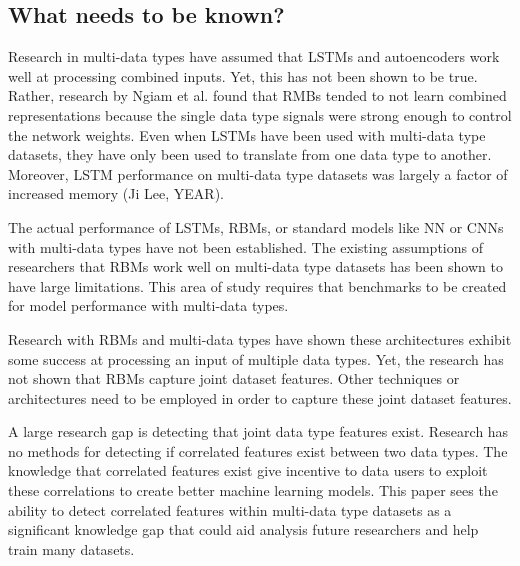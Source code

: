 \subsection{What needs to be known?}

Research in multi-data types have assumed that LSTMs and autoencoders work well at processing combined inputs.  Yet, this has not been shown to be true.  Rather, research by Ngiam et al. found that RMBs tended to not learn combined representations because the single data type signals were strong enough to control the network weights.  Even when LSTMs have been used with multi-data type datasets, they have only been used to translate from one data type to another.  Moreover, LSTM performance on multi-data type datasets was largely a factor of increased memory (Ji Lee, YEAR).

The actual performance of LSTMs, RBMs, or standard models like NN or CNNs with multi-data types have not been established.  The existing assumptions of researchers that RBMs work well on multi-data type datasets has been shown to have large limitations.  This area of study requires that benchmarks to be created for model performance with multi-data types.

Research with RBMs and multi-data types have shown these architectures exhibit some success at processing an input of multiple data types.  Yet, the research has not shown that RBMs capture joint dataset features.  Other techniques or architectures need to be employed in order to capture these joint dataset features.

A large research gap is detecting that joint data type features exist.  Research has no methods for detecting if correlated features exist between two data types.  The knowledge that correlated features exist give incentive to data users to exploit these correlations to create better machine learning models.   This paper sees the ability to detect correlated features within multi-data type datasets as a significant knowledge gap that could aid analysis future researchers and help train many datasets.
